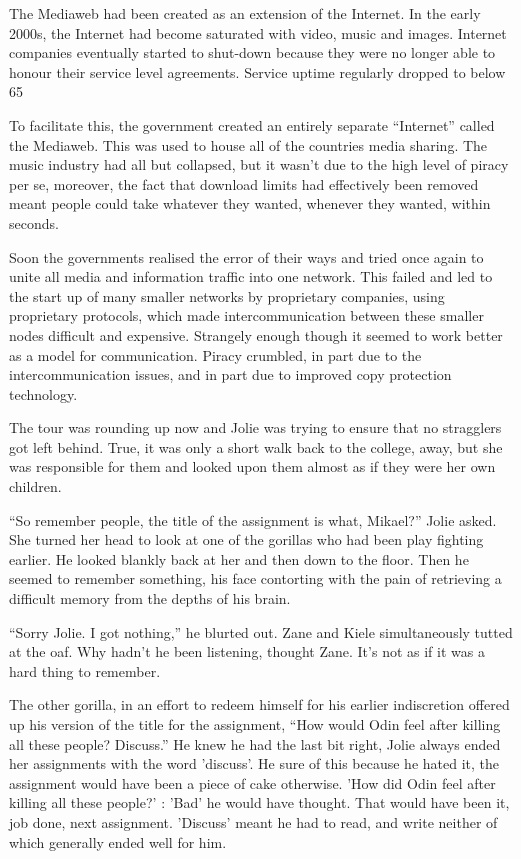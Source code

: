 The Mediaweb had been created as an extension of the Internet.  In the early 2000s, the Internet had become saturated with video, music and images.  Internet companies eventually started to shut-down because they were no longer able to honour their service level agreements.  Service uptime regularly dropped to below 65%

To facilitate this, the government created an entirely separate ``Internet'' called the Mediaweb.  This was used to house all of the countries media sharing.  The music industry had all but collapsed, but it wasn't due to the high level of piracy per se, moreover, the fact that download limits had effectively been removed meant people could take whatever they wanted, whenever they wanted, within seconds.

Soon the governments realised the error of their ways and tried once again to unite all media and information traffic into one network.  This failed and led to the start up of many smaller networks by proprietary companies, using proprietary protocols, which made intercommunication between these smaller nodes difficult and expensive.  Strangely enough though it seemed to work better as a  model for communication.  Piracy crumbled, in part due to the intercommunication issues, and in part due to improved copy protection technology.  



\thoughtbreak



The tour was rounding up now and Jolie was trying to ensure that no stragglers got left behind.  True, it was only a short walk back to the college, away, but she was responsible for them and looked upon them almost as if they were her own children.

``So remember people, the title of the assignment is what, Mikael?''  Jolie asked.  She turned her head to look at one of the gorillas who had been play fighting earlier.  He looked blankly back at her and then down to the floor.  Then he seemed to remember something, his face contorting with the pain of retrieving a difficult memory from the depths of his brain.

``Sorry Jolie.  I got nothing,'' he blurted out.  Zane and Kiele simultaneously tutted at the oaf.  Why hadn't he been listening, thought Zane.  It's not as if it was a hard thing to remember.

The other gorilla, in an effort to redeem himself for his earlier indiscretion offered up his version of the title for the assignment, ``How would Odin feel after killing all these people?  Discuss.''  He knew he had the last bit right, Jolie always ended her assignments with the word 'discuss'.  He sure of this because he hated it, the assignment would have been a piece of cake otherwise.  'How did Odin feel after killing all these people?' : 'Bad' he would have thought.  That would have been it, job done, next assignment.  'Discuss' meant he had to read, and write neither of which generally ended well for him.

